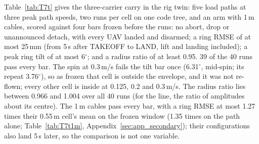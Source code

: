 Table~\ref{tab:T7t} gives the three-carrier carry in the rig twin: five load paths at three peak path speeds, two
runs per cell on one code tree, and an arm with 1\,m cables, scored against four bars frozen before the runs: no
abort, drop or unannounced detach, with every UAV landed and disarmed; a ring RMSE of at most 25\,mm (from 5\,s after TAKEOFF to LAND, lift and landing included); a peak ring
tilt of at most 6$^\circ$; and a radius ratio of at least 0.95. 39 of the 40 runs pass every bar. The spin at
0.3\,m/s fails the tilt bar once (6.31$^\circ$, mid-spin; its repeat 3.76$^\circ$), so as frozen that cell is outside
the envelope, and it was not re-flown; every other cell is inside at 0.125, 0.2 and 0.3\,m/s. The radius ratio lies
between 0.966 and 1.004 over all 40 runs (for the line, the ratio of amplitudes about its centre). The 1\,m cables
pass every bar, with a ring RMSE at most 1.27 times their 0.55\,m cell's mean on the frozen window (1.35 times on the
path alone; Table~\ref{tab:T7t1m}, Appendix~\ref{sec:app_secondary}); their configurations also land 5\,s later, so the
comparison is not one variable.

